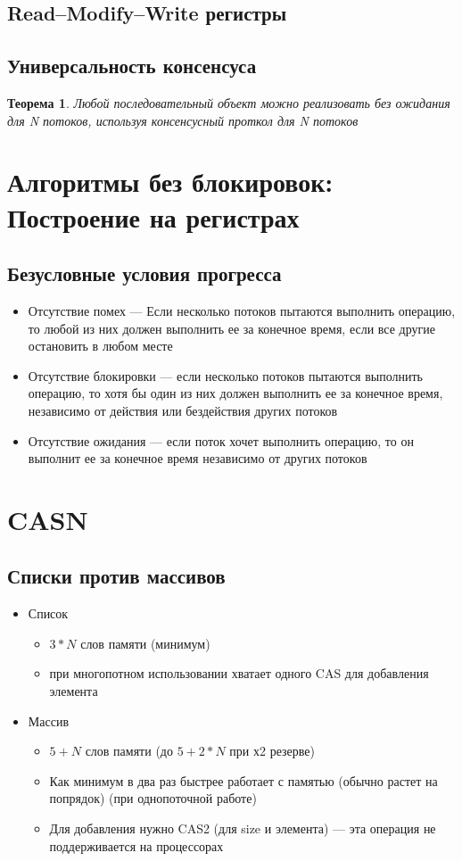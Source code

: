 \documentclass[10pt,a4paper,oneside,titlepage]{article}
\newtheorem{theorem}{Теорема}[section]
\begin{document}
\subsection{Read--Modify--Write регистры}

\subsection{Универсальность консенсуса}
\begin{theorem}
	Любой последовательный объект можно реализовать без ожидания для N потоков, используя консенсусный проткол для N потоков
\end{theorem}

\section{Алгоритмы без блокировок: Построение на регистрах}
\subsection{Безусловные условия прогресса}
\begin{itemize}
	\item Отсутствие помех --- Если несколько потоков пытаются выполнить операцию, то любой из них должен выполнить ее за конечное время, если все другие остановить в любом месте
	\item Отсутствие блокировки --- если несколько потоков пытаются выполнить операцию, то хотя бы один из них должен выполнить ее за конечное время, независимо от действия или бездействия других потоков
	\item Отсутствие ожидания --- если поток хочет выполнить операцию, то он выполнит ее за конечное время независимо от других потоков
\end{itemize}

\section{CASN}
\subsection{Списки против массивов}
\begin{itemize}
	\item Список
	\begin{itemize}
		\item $3*N$ слов памяти (минимум)
		\item при многопотном использовании хватает одного CAS для добавления элемента
	\end{itemize}
    \item Массив
    \begin{itemize}
    	\item $5+N$ слов памяти (до $5+2*N$ при х2 резерве)
    	\item Как минимум в два раз быстрее работает с памятью (обычно растет на попрядок) (при однопоточной работе)
    	\item Для добавления нужно CAS2 (для size и элемента) --- эта операция не поддерживается на процессорах
    \end{itemize}
\end{itemize}
\end{document}
